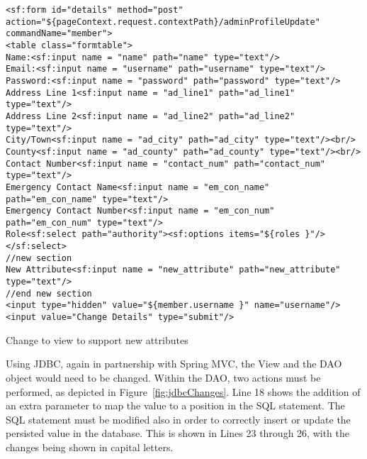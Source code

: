 \begin{table}[H]
\begin{lstlisting}
<sf:form id="details" method="post" action="${pageContext.request.contextPath}/adminProfileUpdate" commandName="member">
<table class="formtable">
Name:<sf:input name = "name" path="name" type="text"/>
Email:<sf:input name = "username" path="username" type="text"/>
Password:<sf:input name = "password" path="password" type="text"/>
Address Line 1<sf:input name = "ad_line1" path="ad_line1" type="text"/>
Address Line 2<sf:input name = "ad_line2" path="ad_line2" type="text"/>
City/Town<sf:input name = "ad_city" path="ad_city" type="text"/><br/>
County<sf:input name = "ad_county" path="ad_county" type="text"/><br/>
Contact Number<sf:input name = "contact_num" path="contact_num" type="text"/>
Emergency Contact Name<sf:input name = "em_con_name" path="em_con_name" type="text"/>
Emergency Contact Number<sf:input name = "em_con_num" path="em_con_num" type="text"/>
Role<sf:select path="authority"><sf:options items="${roles }"/></sf:select>
//new section
New Attribute<sf:input name = "new_attribute" path="new_attribute" type="text"/> 
//end new section
<input type="hidden" value="${member.username }" name="username"/>
<input value="Change Details" type="submit"/>
\end{lstlisting}
\caption{Change to view to support new attributes}
\label{fig:viewChange}
\end{table}
Using JDBC, again in partnership with Spring MVC, the View and the DAO object would need to be changed. Within the DAO, two actions must be performed, as depicted in Figure~\ref{fig:jdbcChanges}. Line 18 shows the addition of an extra parameter to map the value to a position in the SQL statement. The SQL statement must be modified also in order to correctly insert or update the persisted value in the database. This is shown in Lines 23 through 26, with the changes being shown in capital letters. 

